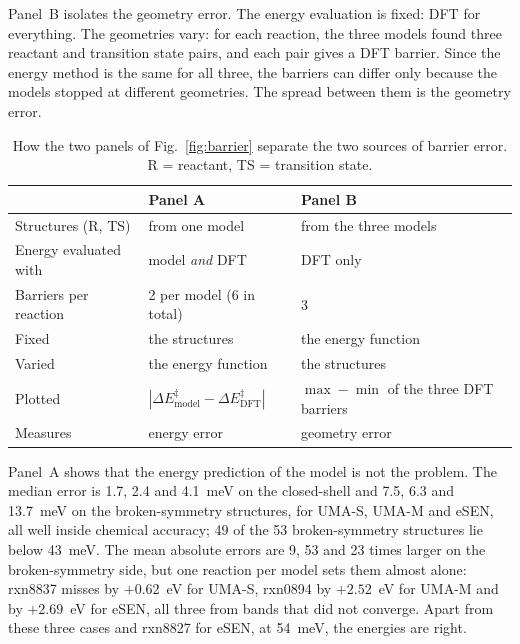 Panel~B isolates the geometry error. The energy evaluation is fixed: DFT
for everything. The geometries vary: for each reaction, the three models
found three reactant and transition state pairs, and each pair gives a DFT
barrier. Since the energy method is the same for all three, the
barriers can differ only because the models stopped at different
geometries. The spread between them is the geometry error.

\begin{table}[H]
  \centering
  \small
  \caption{How the two panels of Fig.~\ref{fig:barrier} separate the two
  sources of barrier error. R = reactant, TS = transition state.}
  \label{tab:panels}
  \begin{tabular}{@{}lll@{}}
    \toprule
                          & Panel A                        & Panel B \\
    \midrule
    Structures (R, TS)    & from one model                 & from the three models \\
    Energy evaluated with & model \emph{and} DFT           & DFT only \\
    Barriers per reaction & 2 per model (6 in total)       & 3 \\
    Fixed                 & the structures                 & the energy function \\
    Varied                & the energy function            & the structures \\
    Plotted               & $|\Delta E^\ddagger_\mathrm{model} - \Delta E^\ddagger_\mathrm{DFT}|$
                          & $\max - \min$ of the three DFT barriers \\
    Measures              & energy error                   & geometry error \\
    \bottomrule
  \end{tabular}
\end{table}

Panel~A shows that the energy prediction of the model is not the
problem. The median error is 1.7,
2.4 and 4.1~meV on the closed-shell and 7.5, 6.3 and 13.7~meV on the
broken-symmetry structures, for UMA-S, UMA-M and eSEN, all well inside
chemical accuracy; 49 of the 53 broken-symmetry structures lie below 43~meV.
The mean absolute errors are 9, 53 and 23 times larger on the broken-symmetry
side, but one reaction per model sets them almost alone: rxn8837 misses by
$+0.62$~eV for UMA-S, rxn0894 by $+2.52$~eV for UMA-M and by $+2.69$~eV for
eSEN, all three from bands that did not converge. Apart from these three
cases and rxn8827 for eSEN, at 54~meV, the energies are right.

